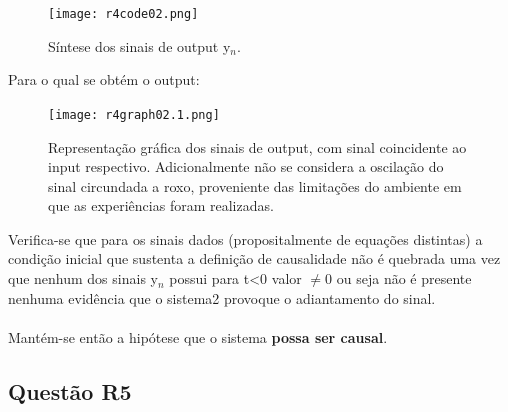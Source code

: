 \documentclass[a4paper,12pt]{article}
\begin{document}
			\begin{figure}[H]
	        		\centering
        	        	\captionsetup{justification=centering}
                		\texttt{[image: r4code02.png]}
                        	\caption{Síntese dos sinais de output y$_n$.}
                	\end{figure}
			Para o qual se obtém o output:
			\begin{figure}[H]
                        	\centering
                          	\captionsetup{justification=centering}
                          	\texttt{[image: r4graph02.1.png]}
                          	\caption{Representação gráfica dos sinais de output, com sinal coincidente ao input respectivo. Adicionalmente não se considera a oscilação do sinal circundada a roxo, proveniente das limitações do ambiente em que as experiências foram realizadas.}
                  	\end{figure}
			Verifica-se que para os sinais dados (propositalmente de equações distintas) a condição inicial que sustenta a definição de causalidade não é quebrada uma vez que nenhum dos sinais y$_n$ possui para t<0 valor $\neq 0$ ou seja não é presente nenhuma evidência que o sistema2 provoque o adiantamento do sinal.\\ \mbox{} \\
		Mantém-se então a hipótese que o sistema \textbf{possa ser causal}.
		\newpage
		\subsection{Questão R5}
\end{document}
